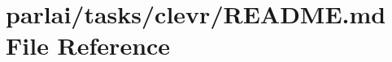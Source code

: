 \hypertarget{parlai_2tasks_2clevr_2README_8md}{}\section{parlai/tasks/clevr/\+R\+E\+A\+D\+ME.md File Reference}
\label{parlai_2tasks_2clevr_2README_8md}
